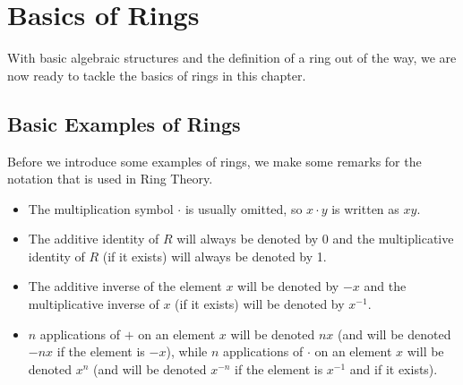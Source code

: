 \chapter{Basics of Rings}
With basic algebraic structures and the definition of a ring out of the way, we are now ready to tackle the basics of rings in this chapter.

\section{Basic Examples of Rings}
Before we introduce some examples of rings, we make some remarks for the notation that is used in Ring Theory.
\begin{itemize}
    \item The multiplication symbol $\cdot$ is usually omitted, so $x \cdot y$ is written as $xy$.
    \item The additive identity of $R$ will always be denoted by 0 and the multiplicative identity of $R$ (if it exists) will always be denoted by 1.
    \item The additive inverse of the element $x$ will be denoted by $-x$ and the multiplicative inverse of $x$ (if it exists) will be denoted by $x^{-1}$.
    \item $n$ applications of $+$ on an element $x$ will be denoted $nx$ (and will be denoted $-nx$ if the element is $-x$), while $n$ applications of $\cdot$ on an element $x$ will be denoted $x^n$ (and will be denoted $x^{-n}$ if the element is $x^{-1}$ and if it exists).
\end{itemize}


